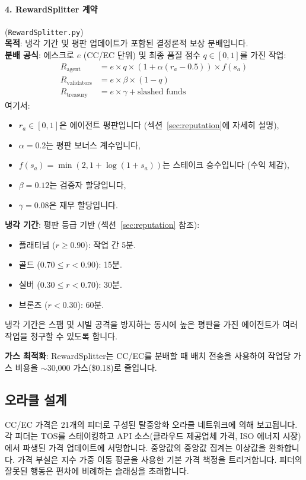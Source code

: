 \documentclass[11pt]{article}
\begin{document}
\paragraph{4. RewardSplitter 계약} (\texttt{RewardSplitter.py})\\
\textbf{목적}: 냉각 기간 및 평판 업데이트가 포함된 결정론적 보상 분배입니다.\\
\textbf{분배 공식}: 에스크로 $e$ (CC/EC 단위) 및 최종 품질 점수 $q \in [0,1]$를 가진 작업:
\begin{align}
R_{\text{agent}} &= e \times q \times \left(1 + \alpha (r_a - 0.5)\right) \times f(s_a) \label{eq:reward-agent} \\
R_{\text{validators}} &= e \times \beta \times (1-q) \label{eq:reward-validators} \\
R_{\text{treasury}} &= e \times \gamma + \text{slashed funds} \label{eq:reward-treasury}
\end{align}
여기서:
\begin{itemize}[noitemsep]
  \item $r_a \in [0,1]$은 에이전트 평판입니다 (섹션~\ref{sec:reputation}에 자세히 설명),
  \item $\alpha = 0.2$는 평판 보너스 계수입니다,
  \item $f(s_a) = \min(2, 1 + \log(1+s_a))$는 스테이크 승수입니다 (수익 체감),
  \item $\beta = 0.12$는 검증자 할당입니다,
  \item $\gamma = 0.08$은 재무 할당입니다.
\end{itemize}
\textbf{냉각 기간}: 평판 등급 기반 (섹션~\ref{sec:reputation} 참조):
\begin{itemize}[noitemsep]
  \item 플래티넘 ($r \geq 0.90$): 작업 간 5분.
  \item 골드 ($0.70 \leq r < 0.90$): 15분.
  \item 실버 ($0.30 \leq r < 0.70$): 30분.
  \item 브론즈 ($r < 0.30$): 60분.
\end{itemize}
냉각 기간은 스팸 및 시빌 공격을 방지하는 동시에 높은 평판을 가진 에이전트가 여러 작업을 청구할 수 있도록 합니다.

\textbf{가스 최적화}: RewardSplitter는 CC/EC를 분배할 때 배치 전송을 사용하여 작업당 가스 비용을 $\sim$30,000 가스(\$0.18)로 줄입니다.

\subsection{오라클 설계}
CC/EC 가격은 21개의 피더로 구성된 탈중앙화 오라클 네트워크에 의해 보고됩니다. 각 피더는 TOS를 스테이킹하고 API 소스(클라우드 제공업체 가격, ISO 에너지 시장)에서 파생된 가격 업데이트에 서명합니다. 중앙값의 중앙값 집계는 이상값을 완화합니다. 가격 부실은 지수 가중 이동 평균을 사용한 기본 가격 책정을 트리거합니다. 피더의 잘못된 행동은 편차에 비례하는 슬래싱을 초래합니다.
\end{document}
